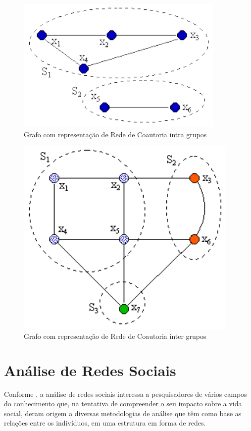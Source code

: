 \begin{figure}[H]
\centering
\includegraphics[scale=0.8]{Imagens/intra-grafo.pdf}
\caption{Grafo com representação de Rede de Coautoria intra grupos}
\label{grafo1}
\end{figure}

\begin{figure}[H]
\centering
\includegraphics[scale=0.8]{Imagens/inter-grafo.pdf}
\caption{Grafo com representação de Rede de Coautoria inter grupos}
\label{grafo2}
\end{figure}

\section{\textbf{Análise de Redes Sociais}}\label{sec:redes_sociais}

Conforme \citep{Silva2006}, a análise de redes sociais interessa a pesquisadores de vários campos do conhecimento que, na tentativa de compreender o seu impacto sobre a vida social, deram origem a diversas metodologias de análise que têm como base as relações entre os indivíduos, em uma estrutura em forma de redes.


